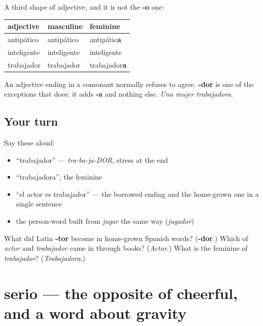 \begin{grammarlens}[title={What you've built}]
A third shape of adjective, and it is not the \textbf{-o} one:

\noindent
\begin{tabularx}{\linewidth}{@{}>{\raggedright\arraybackslash}X>{\raggedright\arraybackslash}X>{\raggedright\arraybackslash}X@{}}
\toprule
\textbf{adjective} & \textbf{masculine} & \textbf{feminine} \\
\midrule
antipático & antipático & antipátic\textbf{a} \\
inteligente & inteligente & inteligente \\
trabajador & trabajador & trabajador\textbf{a} \\
\bottomrule
\end{tabularx}

An adjective ending in a consonant normally refuses to agree. \textbf{-dor} is one of the exceptions that does: it adds \textbf{-a} and nothing else. \emph{Una mujer trabajadora.}
\end{grammarlens}

\subsection*{Your turn}
Say these aloud:

\begin{itemize}
\raggedright
  \item \textquotedblleft{}trabajador\textquotedblright{} — \emph{tra-ba-ja-DOR}, stress at the end
  \item \textquotedblleft{}trabajadora\textquotedblright{}, the feminine
  \item \textquotedblleft{}el actor es trabajador\textquotedblright{} — the borrowed ending and the home-grown one in a single sentence
  \item the person-word built from \emph{jugar} the same way (\emph{jugador})
\end{itemize}

\begin{tcolorbox}[breakable,colback=teal!4,colframe=teal!35!black,title={Before you move on}]
What did Latin \textbf{-tor} become in home-grown Spanish words? (\textbf{-dor}.) Which of \emph{actor} and \emph{trabajador} came in through books? (\emph{Actor}.) What is the feminine of \emph{trabajador}? (\emph{Trabajadora}.)
\end{tcolorbox}
\section[serio]{serio — the opposite of cheerful, and a word about gravity}


